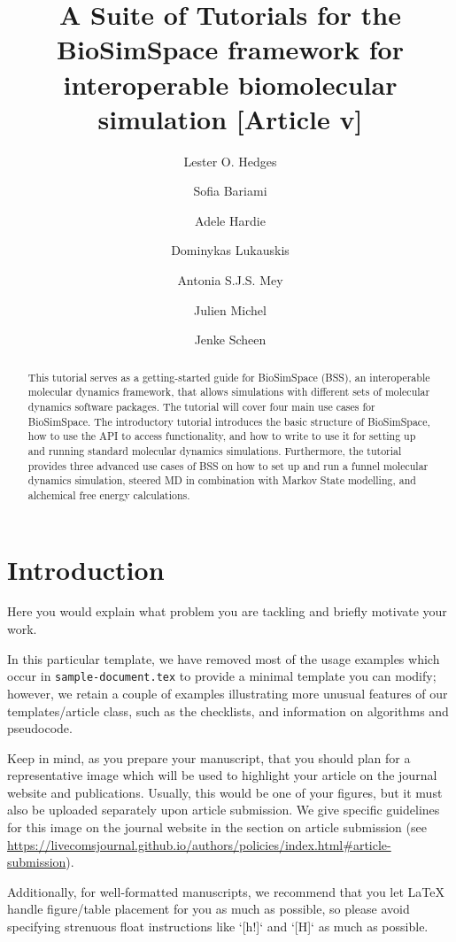 \documentclass[9pt,tutorial]{livecoms}
\title{A Suite of Tutorials for the BioSimSpace framework for interoperable biomolecular simulation [Article v\versionnumber]}
\author[1*]{Lester O. Hedges}
\author[]{Sofia Bariami}
\author[2]{Adele Hardie}
\author[3]{Dominykas Lukauskis}
\author[2]{Antonia S.J.S. Mey}
\author[2*]{Julien Michel}
\author[2\authfn{1}]{Jenke Scheen}
\affil[1]{Advanced Computing Research Centre, University of Bristol, UK}
\affil[2]{EaStCHEM School of
Chemistry, University of Edinburgh, UK}
\affil[3]{Department of Chemistry and Institute of Structural and Molecular Biology, University College
London, UK}
\begin{document}
\begin{frontmatter}
\maketitle

\begin{abstract}
This tutorial serves as a getting-started guide for BioSimSpace (BSS), an interoperable molecular dynamics framework, that allows simulations with different sets of molecular dynamics software packages. The tutorial will cover four main use cases for BioSimSpace. The introductory tutorial introduces the basic structure of BioSimSpace, how to use the API to access functionality, and how to write to use it for setting up and running standard molecular dynamics simulations. Furthermore, the tutorial provides three advanced use cases of BSS on how to set up and run a funnel molecular dynamics simulation, steered MD in combination with Markov State modelling, and alchemical free energy calculations. 
\end{abstract}

\end{frontmatter}




\section{Introduction}

Here you would explain what problem you are tackling and briefly motivate your work.

In this particular template, we have removed most of the usage examples which occur in \texttt{sample-document.tex} to provide a minimal template you can modify; however, we retain a couple of examples illustrating more unusual features of our templates/article class, such as the checklists, and information on algorithms and pseudocode.

Keep in mind, as you prepare your manuscript, that you should plan for a representative image  which will be used to highlight your article on the journal website and publications. Usually, this would be one of your figures, but it must also be uploaded separately upon article submission. We give specific guidelines for this image on the journal website in the section on article submission (see \url{https://livecomsjournal.github.io/authors/policies/index.html#article-submission}).

Additionally, for well-formatted manuscripts, we recommend that you let LaTeX handle figure/table placement for you as much as possible, so please avoid specifying strenuous float instructions like `[h!]` and `[H]` as much as possible.
\end{document}
